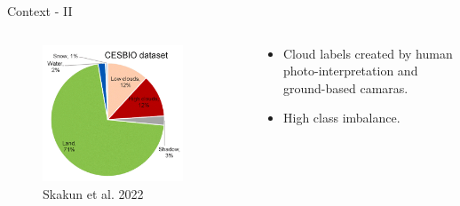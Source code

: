 \begin{frame}{Context - II}
	\begin{columns}
		\begin{column}{0.5\textwidth}
			\begin{figure}
				\includegraphics[width=0.85\textwidth]{images/contex_II.png}
				\caption[fig:introfig01]{Skakun et al. 2022}				
				\label{fig:introfig02}
			\end{figure}	
		\end{column}
		\begin{column}{0.5\textwidth}
			\begin{itemize}
				\item Cloud labels created by human photo-interpretation and ground-based camaras.
				\item High class imbalance.
			\end{itemize}
		\end{column}
	\end{columns}
\end{frame}

